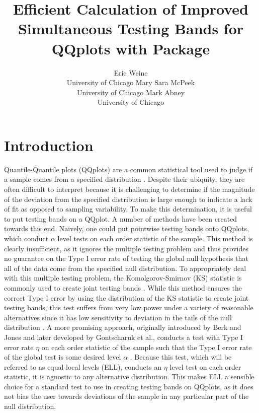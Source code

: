 \documentclass[article]{jss}
\author{Eric Weine\\University of Chicago
   \And Mary Sara McPeek\\University of Chicago
   \And Mark Abney\\University of Chicago}
\title{Efficient Calculation of Improved Simultaneous Testing Bands for QQplots with \proglang{R} Package \pkg{qqconf}}
\begin{document}
\maketitle

\section{Introduction}
Quantile-Quantile plots (QQplots) are a common statistical tool used to judge if a sample comes from a specified distribution \citep{wilk_gnanadesikan_1968}. Despite their ubiquity, they are often difficult to interpret because it is challenging to determine if the magnitude of the deviation from the specified distribution is large enough to indicate a lack of fit as opposed to sampling variability. To make this determination, it is useful to put testing bands on a QQplot.
\newline
\newline
A number of methods have been created towards this end. Naively, one could put pointwise testing bands onto QQplots, which conduct $\alpha$ level tests on each order statistic of the sample. This method is clearly insufficient, as it ignores the multiple testing problem and thus provides no guarantee on the Type I error rate of testing the global null hypothesis that all of the data come from the specified null distribution. To appropriately deal with this multiple testing problem, the Komolgorov-Smirnov (KS) statistic is commonly used to create joint testing bands \citep{kolmogoroff1941confidence, smirnov1944approximate}. While this method ensures the correct Type I error by using the distribution of the KS statistic to create joint testing bands, this test suffers from very low power under a variety of reasonable alternatives since it has low sensitivity to deviation in the tails of the null distribution \citep{aldor2013power}. A more promising approach, originally introduced by Berk and Jones and later developed by Gontscharuk et al., conducts a test with Type I error rate $\eta$ on each order statistic of the sample such that the Type I error rate of the global test is some desired level $\alpha$ \citep{berk1979goodness, gontscharuk2016goodness}. Because this test, which will be referred to as equal local levels (ELL), conducts an $\eta$ level test on each order statistic, it is agnostic to any alternative distribution. This makes ELL a sensible choice for a standard test to use in creating testing bands on QQplots, as it does not bias the user towards deviations of the sample in any particular part of the null distribution.
\end{document}
